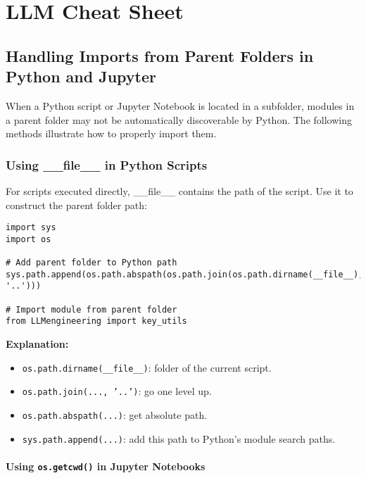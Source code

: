 \chapter{LLM Cheat Sheet}

\section{Handling Imports from Parent Folders in Python and Jupyter}

When a Python script or Jupyter Notebook is located in a subfolder, modules in a parent folder may not be automatically discoverable by Python. The following methods illustrate how to properly import them.

\subsection{Using \_\_file\_\_ in Python Scripts}

For scripts executed directly, \_\_file\_\_ contains the path of the script. Use it to construct the parent folder path:

\begin{tcolorbox}[colback=red!5,colframe=red!70!black,title=Python Script: Using \_\_file\_\_]
\begin{verbatim}
import sys
import os

# Add parent folder to Python path
sys.path.append(os.path.abspath(os.path.join(os.path.dirname(__file__), '..')))

# Import module from parent folder
from LLMengineering import key_utils
\end{verbatim}
\end{tcolorbox}

\textbf{Explanation:}
\begin{itemize}
    \item \texttt{os.path.dirname(\_\_file\_\_)}: folder of the current script.
    \item \texttt{os.path.join(..., '..')}: go one level up.
    \item \texttt{os.path.abspath(...)}: get absolute path.
    \item \texttt{sys.path.append(...)}: add this path to Python's module search paths.
\end{itemize}

\subsubsection{Using \texttt{os.getcwd()} in Jupyter Notebooks}

